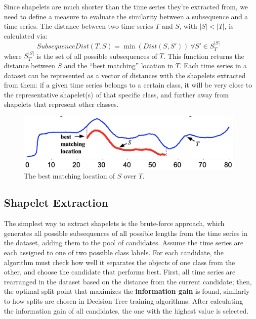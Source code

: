 Since shapelets are much shorter than the time series they're extracted from, we need to define a measure to evaluate the similarity between a subsequence and a time series. The distance between two time series $T$ and $S$, with $|S| < |T|$, is calculated via:
\begin{equation*}
    \textit{SubsequenceDist}(T,S) = \min(\textit{Dist}(S,S')) \ \forall S' \in S_T^{|S|}
\end{equation*}
where $S_T^{|S|}$ is the set of all possible subsequences of $T$. This function returns the distance between $S$ and the ``best matching'' location in $T$. Each time series in a dataset can be represented as a vector of distances with the shapelets extracted from them: if a given time series belongs to a certain class, it will be very close to the representative shapelet(s) of that specific class, and further away from shapelets that represent other classes.

\begin{figure}[h]
    \centering
    \includegraphics[width=0.5\linewidth]{img/subsequencedist.png}
    \caption{The best matching location of $S$ over $T$.}
    \label{fig:subseq-dist}
\end{figure}

\subsection{Shapelet Extraction}

The simplest way to extract shapelets is the brute-force approach, which generates all possible subsequences of all possible lengths from the time series in the dataset, adding them to the pool of candidates. Assume the time series are each assigned to one of two possible class labels. For each candidate, the algorithm must check how well it separates the objects of one class from the other, and choose the candidate that performs best. First, all time series are rearranged in the dataset based on the distance from the current candidate; then, the optimal split point that maximizes the \textbf{information gain} is found, similarly to how splits are chosen in Decision Tree training algorithms. After calculating the information gain of all candidates, the one with the highest value is selected.


